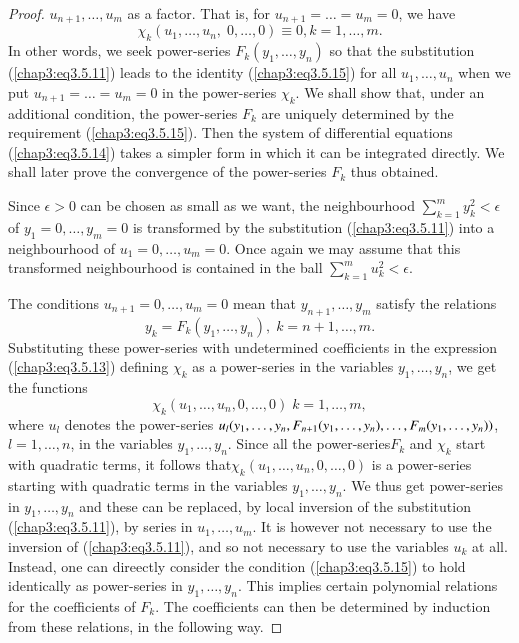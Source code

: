 \begin{proof}
$u_{n+1}, \ldots, u_m$ as a factor. That is, for $u_{n+1} = \ldots =
u_m = 0$, we have  
\begin{equation*}
\chi_k (u_1, \ldots, u_n , \; 0, \ldots, 0) \equiv 0, k =1 , \ldots,
m. \tag{3.5.15}\label{chap3:eq3.5.15} 
\end{equation*}\pageoriginale
In other words, we seek power-series $F_k (y_1, \ldots, y_n)$ so that
the substitution (\ref{chap3:eq3.5.11}) leads to the identity
(\ref{chap3:eq3.5.15}) for all $u_1, \ldots, u_n$ when we put $u_{n+1}
= \ldots = u_m = 0$ in the power-series $\chi_k$. We shall show that,
under an additional condition, the power-series $F_k$ are uniquely
determined by the requirement (\ref{chap3:eq3.5.15}). Then the system
of differential equations (\ref{chap3:eq3.5.14}) takes a simpler form
in which it can be integrated directly. We shall later prove the
convergence of the power-series $F_k$ thus obtained. 

Since $\epsilon > 0$ can be chosen as small as we want, the
neighbourhood $\sum\limits^m_{k=1} y^2_k < \epsilon$ of $y_1 = 0,
\ldots, y_m = 0$ is transformed by the substitution
(\ref{chap3:eq3.5.11}) into a neighbourhood of $u_1=0, \ldots,
u_m=0$. Once again we may assume that this transformed neighbourhood
is contained in the ball $\sum\limits^m_{k=1} u^2_k < \epsilon$. 

The conditions $u_{n+1} = 0, \ldots, u_m=0$ mean that $y_{n+1},\ldots,
y_m$ satisfy the relations 
\begin{equation*}
y_k = F_k (y_1, \ldots, y_n), \;k = n +1 , \ldots,
m. \tag{3.5.16}\label{chap3:eq3.5.16} 
\end{equation*}
Substituting these power-series with undetermined coefficients in the
expression (\ref{chap3:eq3.5.13}) defining $\chi_k$ as a power-series
in the variables $y_1, \ldots, y_n$, we get the functions 
$$
\chi_k (u_1, \ldots, u_n, 0 , \ldots, 0) \; k = 1, \ldots, m,
$$
where $u_l$ denotes the power-series $u_l(y_1, \ldots, y_n, F_{n+1}
(y_1, \ldots, y_n),\ldots,\break F_m(y_1, \ldots, y_n)) $, $l = 1,
\ldots, n$, in the variables $y_1, \ldots, y_n$. Since all the
power-series\pageoriginale $F_k$ and $\chi_k$ start with quadratic
terms, it follows that\break $\chi_k(u_1, \ldots, u_n , 0, \ldots,  0)$ is a
power-series starting with quadratic terms in the variables $y_1,
\ldots, y_n$. We thus get power-series in $y_1, \ldots, y_n$ and these
can be replaced, by local inversion of the substitution
(\ref{chap3:eq3.5.11}), by series in $u_1, \ldots, u_m$. It is however
not necessary to use the inversion of (\ref{chap3:eq3.5.11}), and so
not necessary to use the variables $u_k$ at all. Instead, one can
direectly consider the condition (\ref{chap3:eq3.5.15}) to hold
identically as power-series in $y_1, \ldots, y_n$. This implies
certain polynomial relations for the coefficients of $F_k$. The
coefficients can then be determined by induction from these relations,
in the following way. 


\end{proof}

